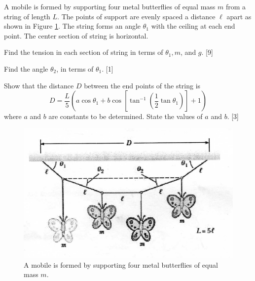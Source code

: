 \begin{problem}
A mobile is formed by supporting four metal butterflies of equal mass $m$ from a string of length $L$. The points of support are evenly spaced a distance $\ell$ apart as shown in Figure \ref{2010q3}. The string forms an angle $\theta_{1}$ with the ceiling at each end point. The center section of string is horizontal. 
    \begin{subproblem}
        Find the tension in each section of string in terms of $\theta_{1}, m$, and $g$.
    \hfill{[9]}\end{subproblem}
    
    \begin{subproblem} 
        Find the angle $\theta_{2}$, in terms of $\theta_{1}$. 
    \hfill{[1]}\end{subproblem}
    
    \begin{subproblem}
    Show that the distance $D$ between the end points of the string is
    \[D=\frac{L}{5}\left(a \cos \theta_{1}+b \cos \left[\tan ^{-1}\left(\frac{1}{2} \tan \theta_{1}\right)\right]+1\right)\]
    where $a$ and $b$ are constants to be determined. State the values of $a$ and $b$.
    \hfill{[3]}\end{subproblem}

    \begin{figure}[h]
        \centering
        \includegraphics[width=\linewidth]{spho_book_TYS_images/2010q3.png}
        \caption{A mobile is formed by supporting four metal butterflies of equal mass $m$.} \label{2010q3}
    \end{figure}
\end{problem}

